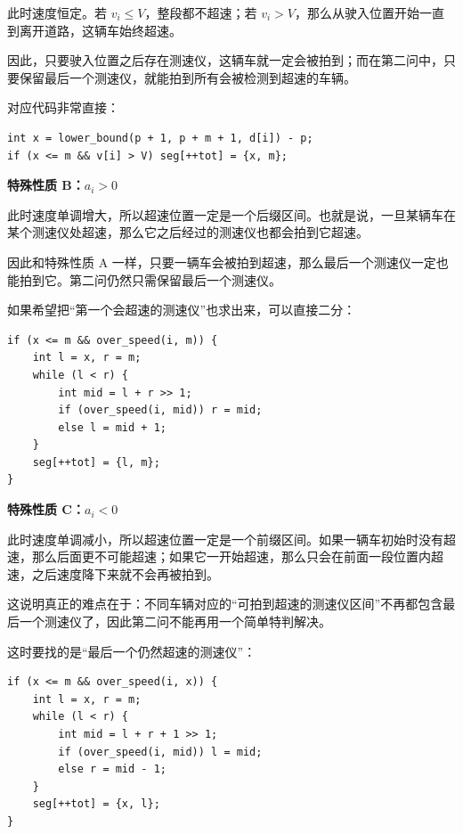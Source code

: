 \documentclass{book}
\begin{document}
    此时速度恒定。若 $v_i\le V$，整段都不超速；若 $v_i>V$，那么从驶入位置开始一直到离开道路，这辆车始终超速。

    因此，只要驶入位置之后存在测速仪，这辆车就一定会被拍到；而在第二问中，只要保留最后一个测速仪，就能拍到所有会被检测到超速的车辆。

    对应代码非常直接：

    \begin{lstlisting}[style = code]
int x = lower_bound(p + 1, p + m + 1, d[i]) - p;
if (x <= m && v[i] > V) seg[++tot] = {x, m};\end{lstlisting}

    \par\medskip
    \noindent\textbf{特殊性质 B：$a_i>0$}
    \par\medskip

    此时速度单调增大，所以超速位置一定是一个后缀区间。也就是说，一旦某辆车在某个测速仪处超速，那么它之后经过的测速仪也都会拍到它超速。

    因此和特殊性质 A 一样，只要一辆车会被拍到超速，那么最后一个测速仪一定也能拍到它。第二问仍然只需保留最后一个测速仪。

    如果希望把“第一个会超速的测速仪”也求出来，可以直接二分：

    \begin{lstlisting}[style = code]
if (x <= m && over_speed(i, m)) {
    int l = x, r = m;
    while (l < r) {
        int mid = l + r >> 1;
        if (over_speed(i, mid)) r = mid;
        else l = mid + 1;
    }
    seg[++tot] = {l, m};
}\end{lstlisting}

    \par\medskip
    \noindent\textbf{特殊性质 C：$a_i<0$}
    \par\medskip

    此时速度单调减小，所以超速位置一定是一个前缀区间。如果一辆车初始时没有超速，那么后面更不可能超速；如果它一开始超速，那么只会在前面一段位置内超速，之后速度降下来就不会再被拍到。

    这说明真正的难点在于：不同车辆对应的“可拍到超速的测速仪区间”不再都包含最后一个测速仪了，因此第二问不能再用一个简单特判解决。

    这时要找的是“最后一个仍然超速的测速仪”：
\newpage
    \begin{lstlisting}[style = code]
if (x <= m && over_speed(i, x)) {
    int l = x, r = m;
    while (l < r) {
        int mid = l + r + 1 >> 1;
        if (over_speed(i, mid)) l = mid;
        else r = mid - 1;
    }
    seg[++tot] = {x, l};
}\end{lstlisting}
\end{document}
